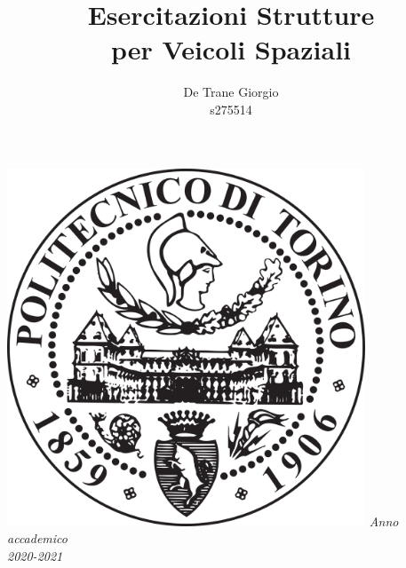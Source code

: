 \documentclass{article}
\author{De Trane Giorgio\\s275514}
\title{\textbf{Esercitazioni Strutture\\per Veicoli Spaziali}}
\begin{document}
    \setlength{\parindent}{0pt}
    \maketitle
    \begin{center}
        \includegraphics[width=0.8\textwidth]{polito_logo.png}
        \linebreak
        \linebreak
        \textit{Anno accademico\\2020-2021}
    \end{center}
    \clearpage
    \tableofcontents
    \clearpage
\end{document}
